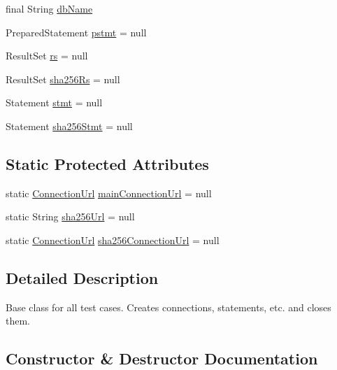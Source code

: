 \begin{DoxyCompactItemize}
final String \mbox{\hyperlink{classtestsuite_1_1_base_test_case_af8fcaf72777e1ea5ace44da305092f02}{db\+Name}}
\item 
Prepared\+Statement \mbox{\hyperlink{classtestsuite_1_1_base_test_case_ad11201d39ce60fd541a261cac7d9a889}{pstmt}} = null
\item 
Result\+Set \mbox{\hyperlink{classtestsuite_1_1_base_test_case_a31fa73417c178b2baaf37ef1362e37d9}{rs}} = null
\item 
Result\+Set \mbox{\hyperlink{classtestsuite_1_1_base_test_case_a0b42d16fb351a34cb4c1f0119e93b5d1}{sha256\+Rs}} = null
\item 
Statement \mbox{\hyperlink{classtestsuite_1_1_base_test_case_a47db7db62d10e395144b1210dc7fd337}{stmt}} = null
\item 
Statement \mbox{\hyperlink{classtestsuite_1_1_base_test_case_a774269ef0c9a559079dfeaf3be301d28}{sha256\+Stmt}} = null
\end{DoxyCompactItemize}
\subsection*{Static Protected Attributes}
\begin{DoxyCompactItemize}
\item 
static \mbox{\hyperlink{classcom_1_1mysql_1_1cj_1_1conf_1_1_connection_url}{Connection\+Url}} \mbox{\hyperlink{classtestsuite_1_1_base_test_case_ae0530f6fd002f79b22ec32bef921884b}{main\+Connection\+Url}} = null
\item 
static String \mbox{\hyperlink{classtestsuite_1_1_base_test_case_aa0a3676bf28f60f30f04e5ec95327ddd}{sha256\+Url}} = null
\item 
static \mbox{\hyperlink{classcom_1_1mysql_1_1cj_1_1conf_1_1_connection_url}{Connection\+Url}} \mbox{\hyperlink{classtestsuite_1_1_base_test_case_a73f65678fa7d11111d0fa7d5ab5b7aa0}{sha256\+Connection\+Url}} = null
\end{DoxyCompactItemize}


\subsection{Detailed Description}
Base class for all test cases. Creates connections, statements, etc. and closes them. 

\subsection{Constructor \& Destructor Documentation}
\mbox{\label{classtestsuite_1_1_base_test_case_a353e63229f72905eb043169b6c2002b5}} 
